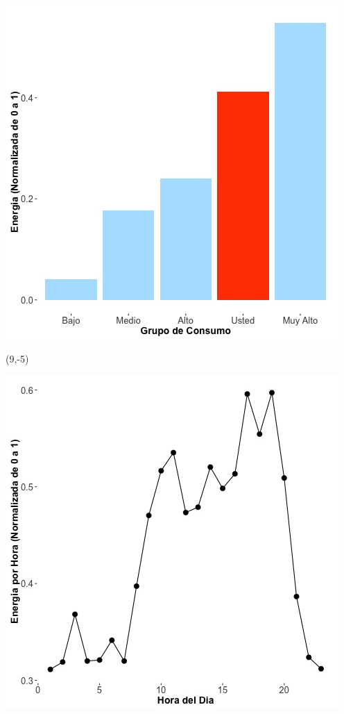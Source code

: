 \documentclass{article}\usepackage[]{graphicx}\usepackage[]{color}
\newenvironment{knitrout}{}{} %
\begin{document}
\begin{knitrout}
\color{fgcolor}
\includegraphics[scale=0.65]{figure/A17_neighbor_plot} 
\end{knitrout}

 \begin{textblock}{1}(9,-5)
\begin{minipage}{20em}
\begingroup

\endgroup
\end{minipage}
\end{textblock}


\begin{knitrout}
\color{fgcolor}
\includegraphics[scale=0.65]{figure/A17_plot_norm_median} 
\end{knitrout}
\end{document}
